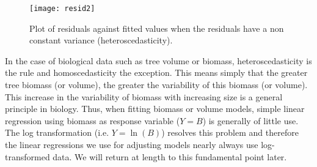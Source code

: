 \begin{figure}[htb]
\begin{center}
\texttt{[image: resid2]}
\end{center}
\caption{Plot of residuals against fitted values when the residuals have a non constant variance (heteroscedasticity).\label{res2}}
\end{figure}


In the case of biological data such as tree volume or biomass, heteroscedasticity is the rule and homoscedasticity the exception. This means simply that the greater tree biomass (or volume), the greater the variability of this biomass (or volume). This increase in the variability of biomass with increasing size is a general principle in biology. Thus, when fitting biomass or volume models, simple linear regression using biomass as response variable ($Y=B$) is generally of little use. The log transformation (i.e. $Y=\ln(B)$) resolves this problem and therefore the linear regressions we use for adjusting models nearly always use log-transformed data. We will return at length to this fundamental point later.

